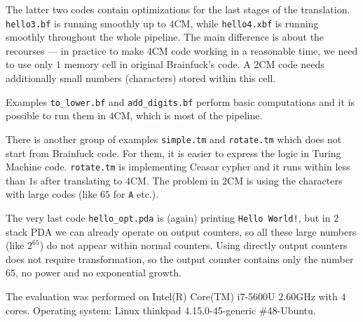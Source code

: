 \documentclass[english,shortabstract,mgr]{iithesis}
\begin{document}
The latter two codes contain optimizations for the last stages of the translation. \texttt{hello3.bf}
is running smoothly up to $4$CM, while \texttt{hello4.xbf} is running smoothly
throughout the whole pipeline. The main difference is about the recourses ---
in practice to make $4$CM code working in a reasonable time, we need to use only
$1$ memory cell in original Brainfuck's code.
A $2$CM code needs additionally small numbers (characters) stored within this cell.

Examples \texttt{to\_lower.bf} and \texttt{add\_digits.bf} perform basic
computations and it is possible to run them in $4$CM, which is most of the pipeline.

There is another group of examples \texttt{simple.tm} and \texttt{rotate.tm}
which does not start from Brainfuck code. For them, it is easier to express
the logic in Turing Machine code. \texttt{rotate.tm} is implementing Ceasar cypher
and it runs within less than $1$s after translating to $4$CM.
The problem in $2$CM is using the characters with large codes (like
$65$ for \texttt{A} etc.).

The very last code \texttt{hello\_opt.pda} is (again) printing
\texttt{Hello World!}, but in $2$ stack PDA we can already operate on
output counters, so all these large numbers (like $2^{65}$) do not
appear within normal counters. Using directly output counters does not
require transformation, so the output counter contains only the number $65$,
no power and no exponential growth.


The evaluation was performed on Intel(R) Core(TM) i7-5600U 2.60GHz
with $4$ cores. Operating system: Linux thinkpad 4.15.0-45-generic \#48-Ubuntu.
\end{document}
